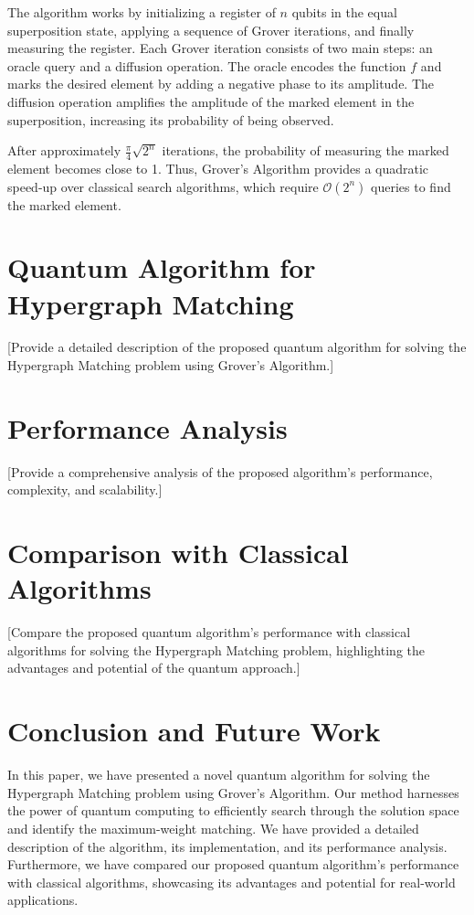 The algorithm works by initializing a register of $n$ qubits in the equal superposition state, applying a sequence of Grover iterations, and finally measuring the register. Each Grover iteration consists of two main steps: an oracle query and a diffusion operation. The oracle encodes the function $f$ and marks the desired element by adding a negative phase to its amplitude. The diffusion operation amplifies the amplitude of the marked element in the superposition, increasing its probability of being observed.

After approximately $\frac{\pi}{4}\sqrt{2^n}$ iterations, the probability of measuring the marked element becomes close to 1. Thus, Grover's Algorithm provides a quadratic speed-up over classical search algorithms, which require $\mathcal{O}(2^n)$ queries to find the marked element.

\section{Quantum Algorithm for Hypergraph Matching}
\label{sec:algorithm}

[Provide a detailed description of the proposed quantum algorithm for solving the Hypergraph Matching problem using Grover's Algorithm.]

\section{Performance Analysis}
\label{sec:analysis}

[Provide a comprehensive analysis of the proposed algorithm's performance, complexity, and scalability.]

\section{Comparison with Classical Algorithms}
\label{sec:comparison}

[Compare the proposed quantum algorithm's performance with classical algorithms for solving the Hypergraph Matching problem, highlighting the advantages and potential of the quantum approach.]

\section{Conclusion and Future Work}
\label{sec:conclusion}

In this paper, we have presented a novel quantum algorithm for solving the Hypergraph Matching problem using Grover's Algorithm. Our method harnesses the power of quantum computing to efficiently search through the solution space and identify the maximum-weight matching. We have provided a detailed description of the algorithm, its implementation, and its performance analysis. Furthermore, we have compared our proposed quantum algorithm's performance with classical algorithms, showcasing its advantages and potential for real-world applications.

